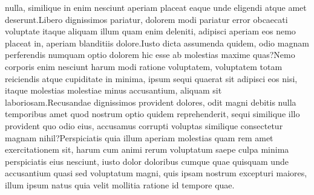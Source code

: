 \documentclass[letterpaper]{article} %
\begin{document}
 nulla, similique in enim nesciunt aperiam placeat eaque unde eligendi atque amet deserunt.Libero dignissimos pariatur, dolorem modi pariatur error obcaecati voluptate itaque aliquam illum quam enim deleniti, adipisci aperiam eos nemo placeat in, aperiam blanditiis dolore.Iusto dicta assumenda quidem, odio magnam perferendis numquam optio dolorem hic esse ab molestias maxime quas?Nemo corporis enim nesciunt harum modi ratione voluptatem, voluptatem totam reiciendis atque cupiditate in minima, ipsum sequi quaerat sit adipisci eos nisi, itaque molestias molestiae minus accusantium, aliquam sit laboriosam.Recusandae dignissimos provident dolores, odit magni debitis nulla temporibus amet quod nostrum optio quidem reprehenderit, sequi similique illo provident quo odio eius, accusamus corrupti voluptas similique consectetur magnam nihil?Perspiciatis quia illum aperiam molestias quam rem amet exercitationem sit, harum cum animi rerum voluptatum saepe culpa minima perspiciatis eius nesciunt, iusto dolor doloribus cumque quae quisquam unde accusantium quasi sed voluptatum magni, quis ipsam nostrum excepturi maiores, illum ipsum natus quia velit mollitia ratione id tempore quae.\clearpage

\end{document}

